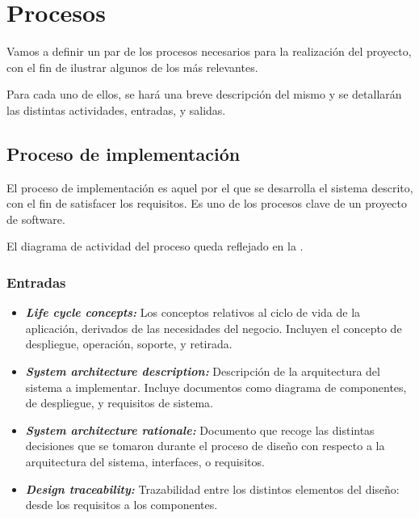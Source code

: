 \section{Procesos}
Vamos a definir un par de los procesos necesarios para la realización del proyecto, con el fin de ilustrar algunos de los más relevantes.

Para cada uno de ellos, se hará una breve descripción del mismo y se detallarán las distintas actividades, entradas, y salidas.


\subsection{Proceso de implementación}  %
El proceso de implementación es aquel por el que se desarrolla el sistema descrito, con el fin de satisfacer los requisitos. Es uno de los procesos clave de un proyecto de software.

El diagrama de actividad del proceso queda reflejado en la .



\subsubsection{Entradas}
\begin{itemize}
  \item \textbf{\textit{Life cycle concepts:}} Los conceptos relativos al ciclo de vida de la aplicación, derivados de las necesidades del negocio. Incluyen el concepto de despliegue, operación, soporte, y retirada.
  \item \textbf{\textit{System architecture description:}} Descripción de la arquitectura del sistema a implementar. Incluye documentos como diagrama de componentes, de despliegue, y requisitos de sistema.
  \item \textbf{\textit{System architecture rationale:}} Documento que recoge las distintas decisiones que se tomaron durante el proceso de diseño con respecto a la arquitectura del sistema, interfaces, o requisitos.
  \item \textbf{\textit{Design traceability:}} Trazabilidad entre los distintos elementos del diseño: desde los requisitos a los componentes.
\end{itemize}


